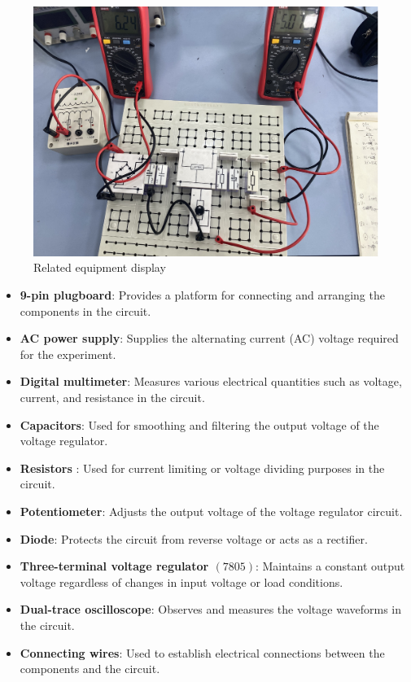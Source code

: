 \documentclass[UTF8]{article}
\begin{document}
	\begin{figure}[H]
	    	\centering
	    	\includegraphics[clip,scale=0.6,trim={0 0 0 0}]{fig/fig1.png}
	        \caption{Related equipment display}
	        \label{figure.1}
    \end{figure}    
    
    \begin{itemize}
    \item \textbf{9-pin plugboard}: Provides a platform for connecting and arranging the components in the circuit.
    \item \textbf{AC power supply}: Supplies the alternating current (AC) voltage required for the experiment.
    \item \textbf{Digital multimeter}: Measures various electrical quantities such as voltage, current, and resistance in the circuit.
    \item \textbf{Capacitors}: Used for smoothing and filtering the output voltage of the voltage regulator.
    \item \textbf{Resistors} : Used for current limiting or voltage dividing purposes in the circuit.
    \item \textbf{Potentiometer}: Adjusts the output voltage of the voltage regulator circuit.
    \item\textbf{Diode}: Protects the circuit from reverse voltage or acts as a rectifier.
    \item \textbf{Three-terminal voltage regulator $(7805)$}: Maintains a constant output voltage regardless of changes in input voltage or load conditions.
    \item \textbf{Dual-trace oscilloscope}: Observes and measures the voltage waveforms in the circuit.
    \item\textbf{Connecting wires}: Used to establish electrical connections between the components and the circuit.
    \end{itemize}
    
\end{document}
